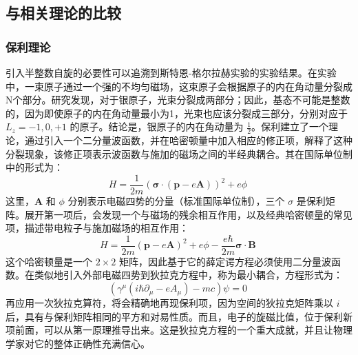 \subsection{与相关理论的比较}
\subsubsection{保利理论}
引入半整数自旋的必要性可以追溯到斯特恩-格尔拉赫实验的实验结果。在实验中，一束原子通过一个强的不均匀磁场，这束原子会根据原子的内在角动量分裂成N个部分。研究发现，对于银原子，光束分裂成两部分；因此，基态不可能是整数的，因为即使原子的内在角动量最小为1，光束也应该分裂成三部分，分别对应于 \(L_z = -1, 0, +1\) 的原子。结论是，银原子的内在角动量为 \( \frac{1}{2} \)。保利建立了一个理论，通过引入一个二分量波函数，并在哈密顿量中加入相应的修正项，解释了这种分裂现象，该修正项表示波函数与施加的磁场之间的半经典耦合。其在国际单位制中的形式为：
\[
H = \frac{1}{2m} \left( \boldsymbol{\sigma} \cdot (\mathbf{p} - e\mathbf{A}) \right)^2 + e \phi~
\]
这里，\(\mathbf{A}\) 和 \(\phi\) 分别表示电磁四势的分量（标准国际单位制），三个 \(\sigma\) 是保利矩阵。展开第一项后，会发现一个与磁场的残余相互作用，以及经典哈密顿量的常见项，描述带电粒子与施加磁场的相互作用：
\[
H = \frac{1}{2m} (\mathbf{p} - e \mathbf{A})^2 + e \phi - \frac{e \hbar}{2m} \boldsymbol{\sigma} \cdot \mathbf{B}~
\]
这个哈密顿量是一个 \(2 \times 2\) 矩阵，因此基于它的薛定谔方程必须使用二分量波函数。在类似地引入外部电磁四势到狄拉克方程中，称为最小耦合，方程形式为：
\[
\left( \gamma^\mu \left( i\hbar \partial_\mu - e A_\mu \right) - mc \right) \psi = 0~
\]
再应用一次狄拉克算符，将会精确地再现保利项，因为空间的狄拉克矩阵乘以 \(i\) 后，具有与保利矩阵相同的平方和对易性质。而且，电子的旋磁比值，位于保利新项前面，可以从第一原理推导出来。这是狄拉克方程的一个重大成就，并且让物理学家对它的整体正确性充满信心。

